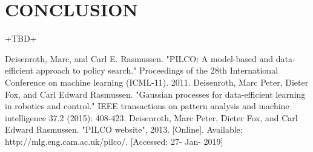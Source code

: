 \documentclass[letterpaper, 10 pt, conference]{ieeeconf}  %
\begin{document}
\section{CONCLUSION}
+TBD+



\begin{thebibliography}{99}

 Deisenroth, Marc, and Carl E. Rasmussen. "PILCO: A model-based and data-efficient approach to policy search." Proceedings of the 28th International Conference on machine learning (ICML-11). 2011.
 Deisenroth, Marc Peter, Dieter Fox, and Carl Edward Rasmussen. "Gaussian processes for data-efficient learning in robotics and control." IEEE transactions on pattern analysis and machine intelligence 37.2 (2015): 408-423.
 Deisenroth, Marc Peter, Dieter Fox, and Carl Edward Rasmussen. "PILCO website", 2013. [Online]. Available: http://mlg.eng.cam.ac.uk/pilco/. [Accessed: 27- Jan- 2019]


\end{thebibliography}
\end{document}
